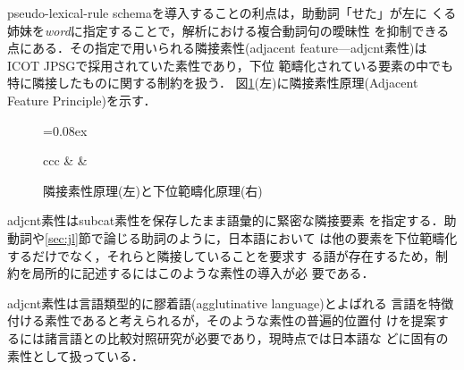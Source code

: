 pseudo-lexical-rule schemaを導入することの利点は，助動詞「せた」が左に
くる姉妹を{\it word\/}に指定することで，解析における複合動詞句の曖昧性
を抑制できる点にある．その指定で用いられる隣接素性(adjacent
feature---{\sc adjcnt}素性)はICOT JPSGで採用されていた素性であり，下位
範疇化されている要素の中でも特に隣接したものに関する制約を扱う．
図\ref{fig:val}(左)に隣接素性原理(Adjacent Feature Principle)を示す．
\begin{figure}
\begin{center}
\unitlength=0.08ex
\begin{tabular}{ccc}
& &
 \\
\end{tabular}
\end{center}
\caption{隣接素性原理(左)と下位範疇化原理(右)}\label{fig:val}
\end{figure}
{\sc adjcnt}素性は{\sc subcat}素性を保存したまま語彙的に緊密な隣接要素
を指定する．助動詞や\ref{sec:jl}節で論じる助詞のように，日本語において
は他の要素を下位範疇化するだけでなく，それらと隣接していることを要求す
る語が存在するため，制約を局所的に記述するにはこのような素性の導入が必
要である．

{\sc adjcnt}素性は言語類型的に膠着語(agglutinative language)とよばれる
言語を特徴付ける素性であると考えられるが，そのような素性の普遍的位置付
けを提案するには諸言語との比較対照研究が必要であり，現時点では日本語な
どに固有の素性として扱っている．

